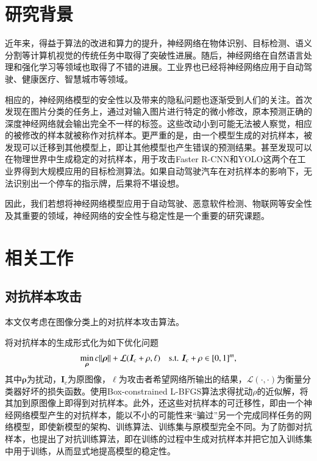 
\chapter{研究背景}

	近年来，得益于算法的改进和算力的提升，神经网络在物体识别\cite{NIPS2012_4824}、目标检测\cite{girshick15fastrcnn}、语义分割\cite{Long_2015_CVPR}等计算机视觉的传统任务中取得了突破性进展。随后，神经网络在自然语言处理\cite{NIPS2014_5346}和强化学习\cite{44806}等领域也取得了不错的进展。工业界也已经将神经网络应用于自动驾驶、健康医疗、智慧城市等领域。
	
	相应的，神经网络模型的安全性以及带来的隐私问题也逐渐受到人们的关注。\citet{szegedy2014intriguing}首次发现在图片分类的任务上，通过对输入图片进行特定的微小修改，原本预测正确的深度神经网络就会输出完全不一样的标签。这些改动小到可能无法被人察觉\cite{carlini2017towards}，相应的被修改的样本就被称作对抗样本。更严重的是，由一个模型生成的对抗样本，被发现可以迁移到其他模型上，即让其他模型也产生错误的预测结果。\citet{sinha2018certifiable}甚至发现可以在物理世界中生成稳定的对抗样本，用于攻击Faster R-CNN\cite{NIPS2015_5638}和YOLO\cite{Redmon_2016_CVPR}这两个在工业界得到大规模应用的目标检测算法。如果自动驾驶汽车在对抗样本的影响下，无法识别出一个停车的指示牌，后果将不堪设想。
	
	因此，我们若想将神经网络模型应用于自动驾驶、恶意软件检测、物联网等安全性及其重要的领域，神经网络的安全性与稳定性是一个重要的研究课题。

\vspace{\baselineskip}
{\let\clearpage\relax \chapter{相关工作}}
\section{对抗样本攻击}
本文仅考虑在图像分类上的对抗样本攻击算法。

\citet{szegedy2014intriguing}将对抗样本的生成形式化为如下优化问题
\begin{align}
\min_{\bm{\rho}} c\lVert \bm{\rho} \rVert + \mathcal{L}(\bm{I}_c + \rho, \ell) \text{\quad s.t. } \bm{I}_c + \rho \in [0,1]^m,
\end{align}
其中$\bm{\rho}$为扰动，$\bm{I}_c$为原图像，$\ell$为攻击者希望网络所输出的结果，$\bm{\mathcal{L}}(\cdot , \cdot)$为衡量分类器好坏的损失函数。\citet{szegedy2014intriguing}使用Box-constrained L-BFGS算法求得扰动$\rho$的近似解，将其加到原图像上即得到对抗样本。此外，\citet{szegedy2014intriguing}还这些对抗样本的可迁移性，即由一个神经网络模型产生的对抗样本，能以不小的可能性来“骗过”另一个完成同样任务的网络模型，即使新模型的架构、训练算法、训练集与原模型完全不同。为了防御对抗样本，\citet{szegedy2014intriguing}也提出了对抗训练算法，即在训练的过程中生成对抗样本并把它加入训练集中用于训练，从而显式地提高模型的稳定性。

